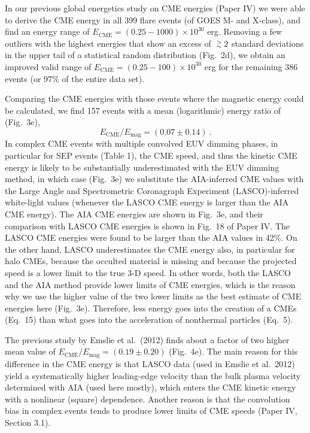\documentclass[10pt,preprint]{aastex}  %
\def\gapprox{\lower.4ex\hbox{$\;\buildrel >\over{\scriptstyle\sim}\;$}}
\begin{document}
In our previous global energetics study on CME energies (Paper IV)
we were able to derive the CME energy in all 399 flare events
(of GOES M- and X-class), and find an energy range of
$E_{\mathrm{CME}}=(0.25 - 1000) \times 10^{30}$ erg. 
Removing a few outliers with the highest energies 
that show an excess of $\gapprox 2$ standard deviations 
in the upper tail of a statistical random 
distribution (Fig.~2d), we obtain an improved valid range of
$E_{\mathrm{CME}} = (0.25 - 100) \times 10^{30}$ erg for the 
remaining 386 events (or 97\% of the entire data set). 

Comparing the CME energies with those events where the magnetic 
energy could be calculated, we find 157 events with a mean 
(logarithmic) energy ratio of (Fig.~3e),
\begin{equation}
        E_{\mathrm{CME}} / E_{\mathrm{mag}} = (0.07 \pm 0.14)  \ .
\end{equation}
In complex CME events with multiple convolved EUV dimming phases,
in particular for SEP events (Table 1), the CME speed, and thus 
the kinetic CME energy is likely to be substantially underestimated
with the EUV dimming method, in which case (Fig.~3e) we substitute the
AIA-inferred CME values with the Large Angle and Spectrometric
Coronagraph Experiment (LASCO)-inferred white-light values
(whenever the LASCO CME energy is larger than the AIA CME energy).
The AIA CME energies are shown in Fig.~3e, and their comparison
with LASCO CME energies is shown in Fig.~18 of Paper IV. The LASCO
CME energies were found to be larger than the AIA values in 42\%.
On the other hand, LASCO underestimates the CME energy also,
in particular for halo CMEs, because the occulted material is missing
and because the projected speed is a lower limit to the true 3-D speed. 
In other words, both the LASCO and the AIA method provide lower
limits of CME energies, which is the reason why we use the higher value
of the two lower limits as the best estimate of CME 
energies here (Fig.~3e). Therefore, less energy goes into 
the creation of a CMEs (Eq.~15) than what goes into the acceleration 
of nonthermal particles (Eq.~5).

The previous study by Emslie et al.~(2012) finds about a factor
of two higher mean value of $E_{\mathrm{CME}}/E_{\mathrm{mag}} 
= (0.19 \pm 0.20)$ (Fig.~4e). The main reason for this difference
in the CME energy is that LASCO data (used in Emslie et al.~2012)
yield a systematically higher leading-edge velocity than the
bulk plasma velocity determined with AIA (used here mostly), which
enters the CME kinetic energy with a nonlinear (square) dependence. 
Another reason is that the convolution bias in complex events tends
to produce lower limits of CME speeds (Paper IV, Section 3.1).
\end{document}
